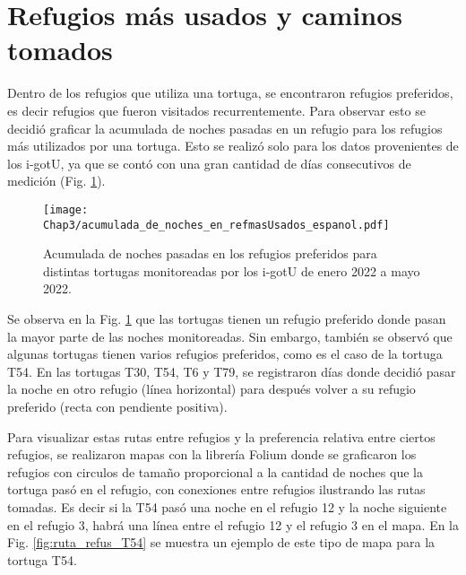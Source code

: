 \section{Refugios más usados y caminos tomados}
Dentro de los refugios que utiliza una tortuga, se encontraron refugios preferidos, es decir refugios que fueron visitados recurrentemente. Para observar esto se decidió graficar la acumulada de noches pasadas en un refugio para los refugios más utilizados por una tortuga. Esto se realizó solo para los datos provenientes de los i-gotU, ya que se contó con una gran cantidad de días consecutivos de medición (Fig. \ref{fig:refugios_preferidos}). 
\begin{figure}[ht]
    \begin{center}
        \texttt{[image: Chap3/acumulada\_de\_noches\_en\_refmasUsados\_espanol.pdf]}
        \caption[Acumulada de noches pasadas en los refugios preferidos.]{Acumulada de noches pasadas en los refugios preferidos para distintas tortugas monitoreadas por los i-gotU de enero 2022 a mayo 2022.}
        \label{fig:refugios_preferidos}
       
        \end{center}
\end{figure}
Se observa en la Fig. \ref{fig:refugios_preferidos} que las tortugas tienen un refugio preferido donde pasan la mayor parte de las noches monitoreadas. Sin embargo, también se observó que algunas tortugas tienen varios refugios preferidos, como es el caso de la tortuga T54. En las tortugas T30, T54, T6 y T79, se registraron días donde decidió pasar la noche en otro refugio (línea horizontal) para después volver a su refugio preferido (recta con pendiente positiva). 

Para visualizar estas rutas entre refugios y la preferencia relativa entre ciertos refugios, se realizaron mapas con la librería Folium donde se graficaron los refugios con circulos de tamaño proporcional a la cantidad de noches que la tortuga pasó en el refugio, con conexiones entre refugios ilustrando las rutas tomadas. Es decir si la T54 pasó una noche en el refugio 12 y la noche siguiente en el refugio 3, habrá una línea entre el refugio 12 y el refugio 3 en el mapa. En la Fig. \ref{fig:ruta_refus_T54} se muestra un ejemplo de este tipo de mapa para la tortuga T54.
 
